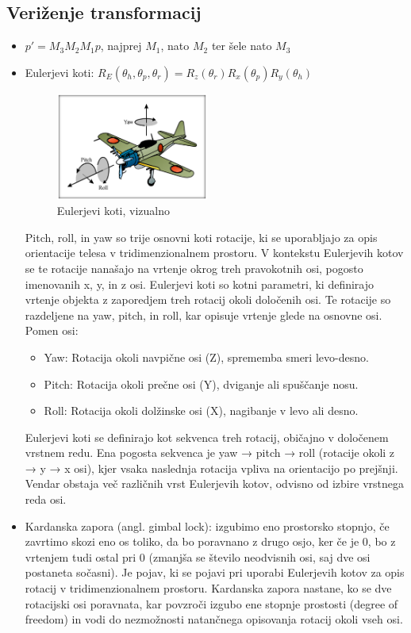 \documentclass{article}
\begin{document}
\subsection{Veriženje transformacij}
\begin{itemize}
    \item $p' = M_3M_2M_1p$, najprej $M_1$, nato $M_2$ ter šele nato $M_3$
    \item Eulerjevi koti: $R_E(\theta_h, \theta_p, \theta_r) = R_z(\theta_r)R_x(\theta_p)R_y(\theta_h)$
    \begin{figure}[H]
    \centering
    \includegraphics[width=50mm]{src/eulerjevi_koti.png}
    \caption{Eulerjevi koti, vizualno}
    \end{figure}
    Pitch, roll, in yaw so trije osnovni koti rotacije, ki se uporabljajo za opis orientacije telesa v tridimenzionalnem prostoru. V kontekstu Eulerjevih kotov se te rotacije nanašajo na vrtenje okrog treh pravokotnih osi, pogosto imenovanih x, y, in z osi. Eulerjevi koti so kotni parametri, ki definirajo vrtenje objekta z zaporedjem treh rotacij okoli določenih osi. Te rotacije so razdeljene na yaw, pitch, in roll, kar opisuje vrtenje glede na osnovne osi. Pomen osi:
    \begin{itemize}
        \item Yaw: Rotacija okoli navpične osi (Z), sprememba smeri levo-desno.
        \item Pitch: Rotacija okoli prečne osi (Y), dviganje ali spuščanje nosu.
        \item Roll: Rotacija okoli dolžinske osi (X), nagibanje v levo ali desno.
    \end{itemize}
    Eulerjevi koti se definirajo kot sekvenca treh rotacij, običajno v določenem vrstnem redu. Ena pogosta sekvenca je yaw → pitch → roll (rotacije okoli z → y → x osi), kjer vsaka naslednja rotacija vpliva na orientacijo po prejšnji. Vendar obstaja več različnih vrst Eulerjevih kotov, odvisno od izbire vrstnega reda osi.
    \item Kardanska zapora (angl. gimbal lock): izgubimo eno prostorsko stopnjo, če zavrtimo skozi eno os toliko, da bo poravnano z drugo osjo, ker če je 0, bo z vrtenjem tudi ostal pri 0 (zmanjša se število neodvisnih osi, saj dve osi postaneta sočasni). Je pojav, ki se pojavi pri uporabi Eulerjevih kotov za opis rotacij v tridimenzionalnem prostoru. Kardanska zapora nastane, ko se dve rotacijski osi poravnata, kar povzroči izgubo ene stopnje prostosti (degree of freedom) in vodi do nezmožnosti natančnega opisovanja rotacij okoli vseh osi.

\end{itemize}
\end{document}
